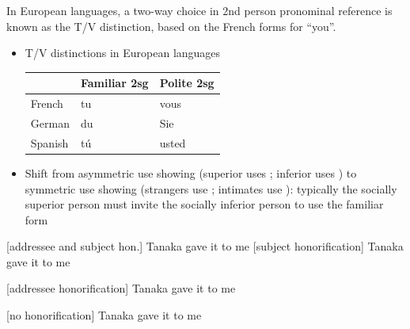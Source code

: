 \documentclass[headrule,footrule]{foils}
\begin{document}

In European languages, a two-way choice in 2nd person pronominal
reference is known as the T/V distinction, based on the French forms
for ``you''.

\begin{itemize}
\item T/V distinctions in European languages
\\[2ex]  \begin{tabular}{lll}
    & Familiar 2sg & Polite 2sg \\ \hline
    French & tu & vous \\
    German & du & Sie \\
    Spanish & t\'u & usted
  \end{tabular}

\item Shift from asymmetric use showing  (superior uses ; inferior uses ) to symmetric use showing  (strangers use  ; intimates use ): typically the socially superior person must invite the socially
  inferior person to use the familiar form
\end{itemize}

\begin{exe}
  \ex {} \hfill [addressee and subject hon.]
  \trans Tanaka gave it to me
 \ex {} \hfill [subject honorification]
  \trans Tanaka gave it to me

 \ex {} \hfill [addressee honorification]
  \trans Tanaka gave it to me

 \ex {} \hfill [no honorification]
  \trans Tanaka gave it to me

\end{exe}
\end{document}
